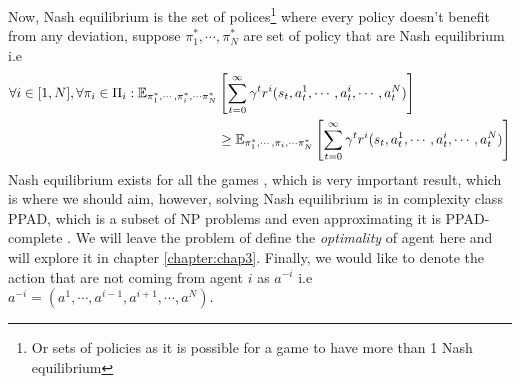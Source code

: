 Now, Nash equilibrium is the set of polices\footnote{Or sets of policies as it is possible for a game to have more than 1 Nash equilibrium} where every policy doesn't benefit from any deviation, suppose $\pi_1^*, \cdots, \pi_N^*$ are set of policy that are Nash equilibrium i.e 
\begin{equation}
\begin{aligned}
    \forall i \in [1, N], \forall \pi_i \in \Pi_i : \mathbb{E}_{\pi_1^*, \cdots, \pi_i^*, \cdots \pi_N^*} &\left[ \sum^\infty_{t=0} \gamma^t  r^i(s_t, a^1_t, \cdots, a^i_t, \cdots, a^{N}_t)  \right] \\
    &\ge \mathbb{E}_{\pi_1^*, \cdots, \pi_i, \cdots \pi_N^*} \left[ \sum^\infty_{t=0} \gamma^t  r^i(s_t, a^1_t, \cdots, a^i_t, \cdots, a^{N}_t)  \right]
\end{aligned}
\end{equation}
Nash equilibrium exists for all the games \cite{nash1950equilibrium}, which is very important result, which is where we should aim, however, solving Nash equilibrium is in complexity class PPAD, which is a subset of NP problems \cite{daskalakis2009complexity} and even approximating it is PPAD-complete \cite{daskalakis2013complexity}. We will leave the problem of define the \textit{optimality} of agent here and will explore it in chapter \ref{chapter:chap3}. Finally, we would like to denote the action that are not coming from agent $i$ as $a^{-i}$ i.e $a^{-i} = (a^1, \cdots, a^{i-1}, a^{i+1}, \cdots, a^N)$. 

